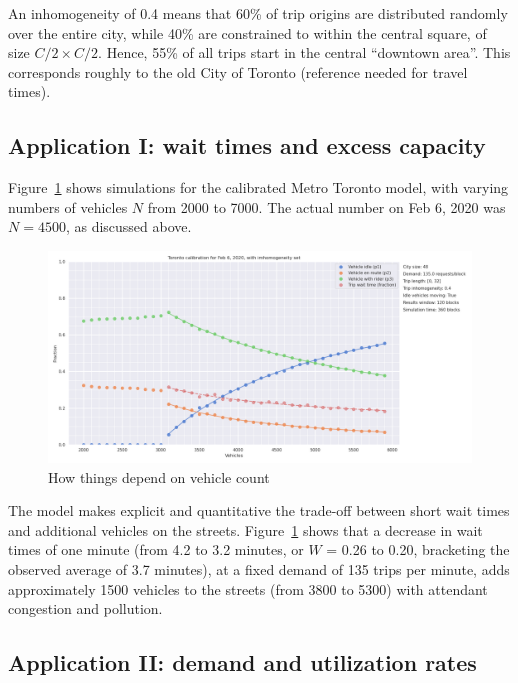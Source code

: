 \documentclass[
  letterpaper,
  DIV=11,
  numbers=noendperiod]{scrartcl}
\begin{document}
An inhomogeneity of 0.4 means that 60\% of trip origins are distributed
randomly over the entire city, while 40\% are constrained to within the
central square, of size \(C/2 \times C/2\). Hence, 55\% of all trips
start in the central ``downtown area''. This corresponds roughly to the
old City of Toronto (reference needed for travel times).

\hypertarget{application-i-wait-times-and-excess-capacity}{%
\subsection{Application I: wait times and excess
capacity}\label{application-i-wait-times-and-excess-capacity}}

Figure~\ref{fig-toronto-final} shows simulations for the calibrated
Metro Toronto model, with varying numbers of vehicles \(N\) from 2000 to
7000. The actual number on Feb 6, 2020 was \(N=4500\), as discussed
above.

\begin{figure}

{\centering \includegraphics{toronto_vehicle_count.png}

}

\caption{\label{fig-toronto-final}How things depend on vehicle count}

\end{figure}

The model makes explicit and quantitative the trade-off between short
wait times and additional vehicles on the streets.
Figure~\ref{fig-toronto-final} shows that a decrease in wait times of
one minute (from 4.2 to 3.2 minutes, or \(W\) = 0.26 to 0.20, bracketing
the observed average of 3.7 minutes), at a fixed demand of 135 trips per
minute, adds approximately 1500 vehicles to the streets (from 3800 to
5300) with attendant congestion and pollution.

\hypertarget{application-ii-demand-and-utilization-rates}{%
\subsection{Application II: demand and utilization
rates}\label{application-ii-demand-and-utilization-rates}}
\end{document}
